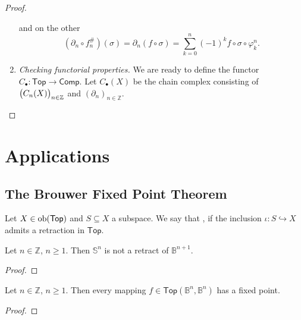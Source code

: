 \begin{proof}
\begin{enumerate}[label = \textit{Step \arabic*:},wide = 0pt, itemsep = 1.5ex]
\begin{equation*}
			\end{equation*}
			\noindent and on the other
			\begin{equation*}
				(\partial_n \circ f^\#_n)(\sigma) = \partial_n(f \circ \sigma) = \sum_{k = 0}^n (-1)^k f \circ \sigma \circ \varphi^n_k.
			\end{equation*}
		\item \textit{Checking functorial properties.} We are ready to define the functor $C_\bullet : \mathsf{Top} \to \mathsf{Comp}$. Let $C_\bullet(X)$ be the chain complex consisting of $\del[1]{C_n(X)}_{n \in \mathbb{Z}}$ and $(\partial_n)_{n \in \mathbb{Z}}$.   
	\end{enumerate}
\end{proof}

\section*{Applications}
\subsection*{The Brouwer Fixed Point Theorem}

\begin{definition}[Retract]
	Let $X \in \operatorname{ob}(\mathsf{Top})$ and $S \subseteq X$ a subspace. We say that ,  if the inclusion $\iota : S \hookrightarrow X$ admits a retraction in $\mathsf{Top}$.
\end{definition}

\begin{lemma}
	Let $n \in \mathbb{Z}$, $n \geq 1$. Then $\mathbb{S}^n$ is not a retract of $\mathbb{B}^{n + 1}$.	
\end{lemma}

\begin{proof}
	
\end{proof}

\begin{theorem}
	Let $n \in \mathbb{Z}$, $n \geq 1$. Then every mapping $f \in \mathsf{Top}(\mathbb{B}^n,\mathbb{B}^n)$ has a fixed point.	
	\label{thm:brouwer_fixed_point}
\end{theorem}

\begin{proof}
	
\end{proof}
